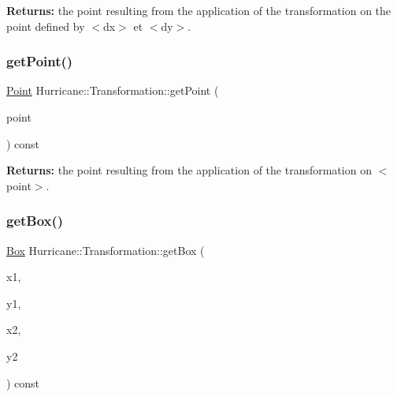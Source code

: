 {\bfseries Returns\+:} the point resulting from the application of the transformation on the point defined by {\ttfamily $<$dx$>$} et {\ttfamily $<$dy$>$}. \mbox{\label{classHurricane_1_1Transformation_a002347125ae10c408aa5e74d3c36d62f}} 
\subsubsection{\texorpdfstring{get\+Point()}{getPoint()}\hspace{0.1cm}{\footnotesize\ttfamily [2/2]}}
{\footnotesize\ttfamily \mbox{\hyperlink{classHurricane_1_1Point}{Point}} Hurricane\+::\+Transformation\+::get\+Point (\begin{DoxyParamCaption}\item[{const \mbox{\hyperlink{classHurricane_1_1Point}{Point}} \&}]{point }\end{DoxyParamCaption}) const}

{\bfseries Returns\+:} the point resulting from the application of the transformation on {\ttfamily $<$point$>$}. \mbox{\label{classHurricane_1_1Transformation_a1335b209ff017d8bfd6f81ae65ae6cd7}} 
\subsubsection{\texorpdfstring{get\+Box()}{getBox()}\hspace{0.1cm}{\footnotesize\ttfamily [1/3]}}
{\footnotesize\ttfamily \mbox{\hyperlink{classHurricane_1_1Box}{Box}} Hurricane\+::\+Transformation\+::get\+Box (\begin{DoxyParamCaption}\item[{const \mbox{\hyperlink{group__DbUGroup_ga4fbfa3e8c89347af76c9628ea06c4146}{Db\+U\+::\+Unit}} \&}]{x1,  }\item[{const \mbox{\hyperlink{group__DbUGroup_ga4fbfa3e8c89347af76c9628ea06c4146}{Db\+U\+::\+Unit}} \&}]{y1,  }\item[{const \mbox{\hyperlink{group__DbUGroup_ga4fbfa3e8c89347af76c9628ea06c4146}{Db\+U\+::\+Unit}} \&}]{x2,  }\item[{const \mbox{\hyperlink{group__DbUGroup_ga4fbfa3e8c89347af76c9628ea06c4146}{Db\+U\+::\+Unit}} \&}]{y2 }\end{DoxyParamCaption}) const}

